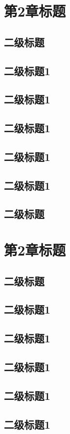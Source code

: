 \documentclass[master,academic]{ysuthesis} %
\begin{document}
	\chapter{第2章标题}
	\section{二级标题}
	\section{二级标题1}
	\section{二级标题1}
	\section{二级标题1}
	\section{二级标题1}
	\section{二级标题1}
	\section{二级标题}
	\chapter{第2章标题}
	\section{二级标题}
	\section{二级标题1}
	\section{二级标题1}
	\section{二级标题1}
	\section{二级标题1}
	\section{二级标题1}
\end{document}
